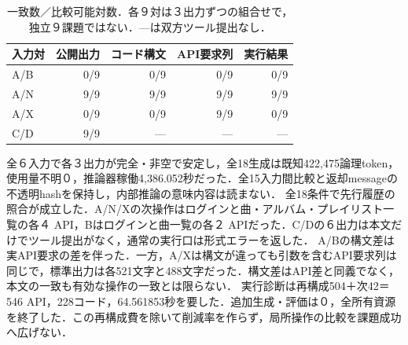\begin{table}[tb]
\centering\footnotesize\setlength{\tabcolsep}{3pt}
\caption{一致数／比較可能対数．各９対は３出力ずつの組合せで，独立９課題ではない．---は双方ツール提出なし．}
\begin{tabular}{lrrrr}
入力対 & 公開出力 & コード構文 & API要求列 & 実行結果 \\ \hline
A/B & 0/9 & 0/9 & 0/9 & 0/9 \\
A/N & 9/9 & 9/9 & 9/9 & 9/9 \\
A/X & 0/9 & 0/9 & 9/9 & 0/9 \\
C/D & 9/9 & --- & --- & --- \\
\hline\end{tabular}
\end{table}
全６入力で各３出力が完全・非空で安定し，全18生成は既知422,475論理token，使用量不明０，推論器稼働4,386.052秒だった．全15入力間比較と返却messageの不透明hashを保持し，内部推論の意味内容は読まない．
全18条件で先行履歴の照合が成立した．A/N/Xの次操作はログインと曲・アルバム・プレイリスト一覧の各４ API，Bはログインと曲一覧の各２ APIだった．C/Dの６出力は本文だけでツール提出がなく，通常の実行口は形式エラーを返した．
A/Bの構文差は実API要求の差を伴った．一方，A/Xは構文が違っても引数を含むAPI要求列は同じで，標準出力は各521文字と488文字だった．構文差はAPI差と同義でなく，本文の一致も有効な操作の一致とは限らない．
実行診断は再構成504＋次42＝546 API，228コード，64.561853秒を要した．追加生成・評価は０，全所有資源を終了した．この再構成費を除いて削減率を作らず，局所操作の比較を課題成功へ広げない．
